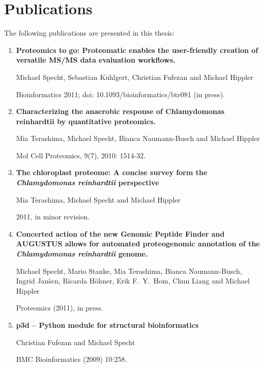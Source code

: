 \chapter{Publications}

The following publications are presented in this thesis:

\begin{enumerate}
\item 
{\bf Proteomics to go: Proteomatic enables the user-friendly creation of versatile MS/MS data evaluation workflows.}

Michael Specht, Sebastian Kuhlgert, Christian Fufezan and Michael Hippler

Bioinformatics 2011; doi: 10.1093/bioinformatics/btr081 (in press).

\item
{\bf Characterizing the anaerobic response of Chlamydomonas reinhardtii by quantitative proteomics.}

Mia Terashima, Michael Specht, Bianca Naumann-Busch and Michael Hippler

Mol Cell Proteomics, 9(7), 2010: 1514-32.

\item
{\bf The chloroplast proteome: A concise survey form the {\em Chlamydomonas reinhardtii} perspective}

Mia Terashima, Michael Specht and Michael Hippler

2011, in minor revision.

\item
{\bf Concerted action of the new Genomic Peptide Finder and AUGUSTUS allows for automated proteogenomic annotation of the {\em Chlamydomonas reinhardtii} genome.}

Michael Specht, Mario Stanke, Mia Terashima, Bianca Naumann-Busch, Ingrid Jan\"sen, Ricarda H\"ohner, Erik F.~Y.~Hom, Chun Liang and Michael Hippler

Proteomics (2011), in press.

% 
\item
{\bf p3d -- Python module for structural bioinformatics}

Christian Fufezan and Michael Specht

BMC Bioinformatics (2009) 10:258.

\end{enumerate}

